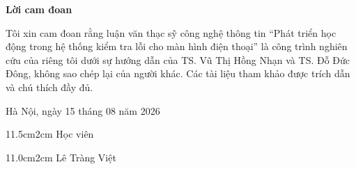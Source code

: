 \setcounter{page}{1}
\begin{center}
\textbf{\large{Lời cam đoan}	}
\end{center}
Tôi xin cam đoan rằng luận văn thạc sỹ công nghệ thông tin “Phát triển học động trong hệ thống kiểm tra lỗi cho màn hình điện thoại” là công trình nghiên cứu của riêng tôi dưới sự hướng dẫn của TS. Vũ Thị Hồng Nhạn và TS. Đỗ Đức Đông, không sao chép lại của người khác. Các tài liệu tham khảo được trích dẫn và chú thích đầy đủ. 

\begin{flushright}
Hà Nội, ngày 15 tháng 08 năm 2026
\end{flushright}

\begin{changemargin}{11.5cm}{2cm}
Học viên
\\[2cm]
\end{changemargin}

\begin{changemargin}{11.0cm}{2cm}
Lê Tràng Việt
\end{changemargin}